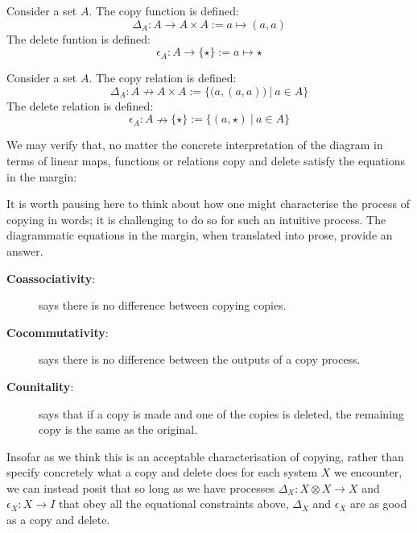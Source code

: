 \begin{example}
Consider a set $A$. The copy function is defined:
\[\Delta_A : A \rightarrow A \times A := a \mapsto (a,a)\]
The delete funtion is defined:
\[\epsilon_A : A \rightarrow \{\star\} := a \mapsto \star\]
\end{example}

\begin{example}\label{relcopy}
Consider a set $A$. The copy relation is defined:
\[\Delta_A : A \nrightarrow A \times A := \{\big(a , (a,a) \big) \ | \ a \in A\}\]
The delete relation is defined:
\[\epsilon_A : A \nrightarrow \{\star\} := \{(a,\star) \ | \ a \in A\}\]
\end{example}

We may verify that, no matter the concrete interpretation of the diagram in terms of linear maps, functions or relations copy and delete satisfy the equations in the margin:

It is worth pausing here to think about how one might characterise the process of copying in words; it is challenging to do so for such an intuitive process. The diagrammatic equations in the margin, when translated into prose, provide an answer.
\begin{description}
\item[\textbf{Coassociativity}:] says there is no difference between copying copies.
\item[\textbf{Cocommutativity}:] says there is no difference between the outputs of a copy process.
\item[\textbf{Counitality}:] says that if a copy is made and one of the copies is deleted, the remaining copy is the same as the original.
\end{description}

Insofar as we think this is an acceptable characterisation of copying, rather than specify concretely what a copy and delete does for each system $X$ we encounter, we can instead posit that so long as we have processes $\Delta_X: X \otimes X \rightarrow X$ and $\epsilon_X: X \rightarrow I$ that obey all the equational constraints above, $\Delta_X$ and $\epsilon_X$ are as good as a copy and delete.

